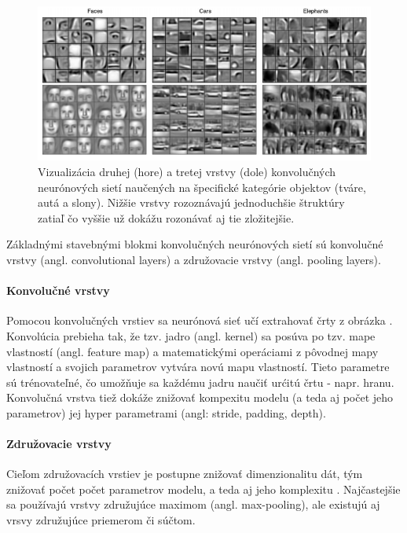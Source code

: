 \begin{figure}[h!]
    \centering
    \includegraphics[scale=0.5]{assets/images/cnn.png}
    \caption{
        Vizualizácia druhej (hore) a tretej vrstvy (dole) konvolučných neurónových sietí naučených na špecifické kategórie objektov (tváre, autá a slony). \cite{Lee_Grosse_Ranganath_Ng} Nižšie vrstvy rozoznávajú jednoduchšie štruktúry zatiaľ čo vyššie už dokážu rozonávať aj tie zložitejšie.
    }
    \label{fig:cnn}
\end{figure}

Základnými stavebnými blokmi konvolučných neurónových sietí sú konvolučné vrstvy (angl. convolutional layers) a združovacie vrstvy (angl. pooling layers).

\paragraph{Konvolučné vrstvy}

Pomocou konvolučných vrstiev sa neurónová sieť učí extrahovať črty z obrázka \cite{haykin2009neural}. Konvolúcia prebieha tak, že tzv. jadro (angl. kernel) sa posúva po tzv. mape vlastností (angl. feature map) a matematickými operáciami z pôvodnej mapy vlastností a svojich parametrov vytvára novú mapu vlastností. Tieto parametre sú trénovateľné, čo umožňuje sa každému jadru naučiť urćitú črtu - napr. hranu. Konvolučná vrstva tiež dokáže znižovať kompexitu modelu (a teda aj počet jeho parametrov) jej hyper parametrami (angl: stride, padding, depth).

\paragraph{Združovacie vrstvy}

Cieľom združovacích vrstiev je postupne znižovať dimenzionalitu dát, tým znižovať počet počet parametrov modelu, a teda aj jeho komplexitu \cite{o2015introduction}. Najčastejšie sa používajú vrstvy združujúce maximom (angl. max-pooling), ale existujú aj vrsvy združujúce priemerom či súčtom.

